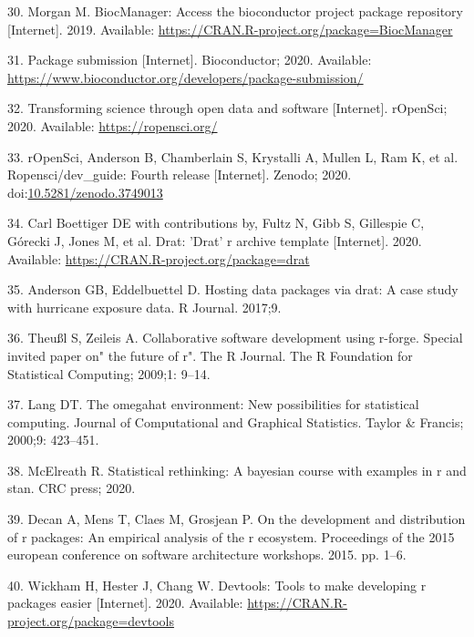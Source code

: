 \documentclass[10pt,letterpaper]{article}
\begin{document}
\leavevmode\hypertarget{ref-BiocManager}{}%
30. Morgan M. BiocManager: Access the bioconductor project package
repository {[}Internet{]}. 2019. Available:
\url{https://CRAN.R-project.org/package=BiocManager}

\leavevmode\hypertarget{ref-biocpkgsub2020}{}%
31. Package submission {[}Internet{]}. Bioconductor; 2020. Available:
\url{https://www.bioconductor.org/developers/package-submission/}

\leavevmode\hypertarget{ref-ropensci2020}{}%
32. Transforming science through open data and software {[}Internet{]}.
rOpenSci; 2020. Available: \url{https://ropensci.org/}

\leavevmode\hypertarget{ref-ropenscidev2020}{}%
33. rOpenSci, Anderson B, Chamberlain S, Krystalli A, Mullen L, Ram K,
et al. Ropensci/dev\_guide: Fourth release {[}Internet{]}. Zenodo; 2020.
doi:\href{https://doi.org/10.5281/zenodo.3749013}{10.5281/zenodo.3749013}

\leavevmode\hypertarget{ref-drat}{}%
34. Carl Boettiger DE with contributions by, Fultz N, Gibb S, Gillespie
C, Górecki J, Jones M, et al. Drat: 'Drat' r archive template
{[}Internet{]}. 2020. Available:
\url{https://CRAN.R-project.org/package=drat}

\leavevmode\hypertarget{ref-anderson2017}{}%
35. Anderson GB, Eddelbuettel D. Hosting data packages via drat: A case
study with hurricane exposure data. R Journal. 2017;9.

\leavevmode\hypertarget{ref-theussl2009}{}%
36. Theußl S, Zeileis A. Collaborative software development using
r-forge. Special invited paper on" the future of r". The R Journal. The
R Foundation for Statistical Computing; 2009;1: 9--14.

\leavevmode\hypertarget{ref-lang2000}{}%
37. Lang DT. The omegahat environment: New possibilities for statistical
computing. Journal of Computational and Graphical Statistics. Taylor \&
Francis; 2000;9: 423--451.

\leavevmode\hypertarget{ref-mcelreath2020}{}%
38. McElreath R. Statistical rethinking: A bayesian course with examples
in r and stan. CRC press; 2020.

\leavevmode\hypertarget{ref-decan2015}{}%
39. Decan A, Mens T, Claes M, Grosjean P. On the development and
distribution of r packages: An empirical analysis of the r ecosystem.
Proceedings of the 2015 european conference on software architecture
workshops. 2015. pp. 1--6.

\leavevmode\hypertarget{ref-devtools}{}%
40. Wickham H, Hester J, Chang W. Devtools: Tools to make developing r
packages easier {[}Internet{]}. 2020. Available:
\url{https://CRAN.R-project.org/package=devtools}
\end{document}
